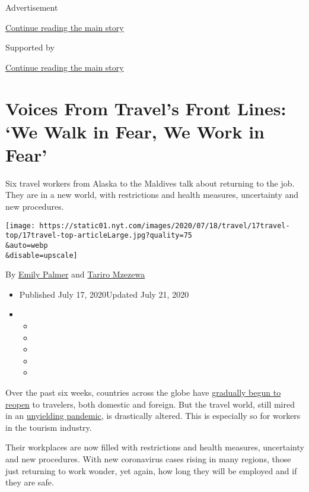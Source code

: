 Advertisement

\protect\hyperlink{after-top}{Continue reading the main story}

Supported by

\protect\hyperlink{after-sponsor}{Continue reading the main story}

\hypertarget{voices-from-travels-front-lines-we-walk-in-fear-we-work-in-fear}{%
\section{Voices From Travel's Front Lines: `We Walk in Fear, We Work in
Fear'}\label{voices-from-travels-front-lines-we-walk-in-fear-we-work-in-fear}}

Six travel workers from Alaska to the Maldives talk about returning to
the job. They are in a new world, with restrictions and health measures,
uncertainty and new procedures.

\texttt{[image: https://static01.nyt.com/images/2020/07/18/travel/17travel-top/17travel-top-articleLarge.jpg?quality=75\\\&auto=webp\\\&disable=upscale]}

By \href{https://www.nytimes.com/by/emily-palmer}{Emily Palmer} and
\href{https://www.nytimes.com/by/tariro-mzezewa}{Tariro Mzezewa}

\begin{itemize}
\item
  Published July 17, 2020Updated July 21, 2020
\item
  \begin{itemize}
  \item
  \item
  \item
  \item
  \item
  \end{itemize}
\end{itemize}

Over the past six weeks, countries across the globe have
\href{https://www.nytimes.com/2020/06/12/travel/reopening-europe-caribbean-virus.html}{gradually
begun to reopen} to travelers, both domestic and foreign. But the travel
world, still mired in an
\href{https://www.nytimes.com/news-event/coronavirus?action=click\&pgtype=Article\&state=default\&module=styln-coronavirus-national\&variant=show\&region=TOP_BANNER\&context=storylines_menu}{unyielding
pandemic}, is drastically altered. This is especially so for workers in
the tourism industry.

Their workplaces are now filled with restrictions and health measures,
uncertainty and new procedures. With new coronavirus cases rising in
many regions, those just returning to work wonder, yet again, how long
they will be employed and if they are safe.

